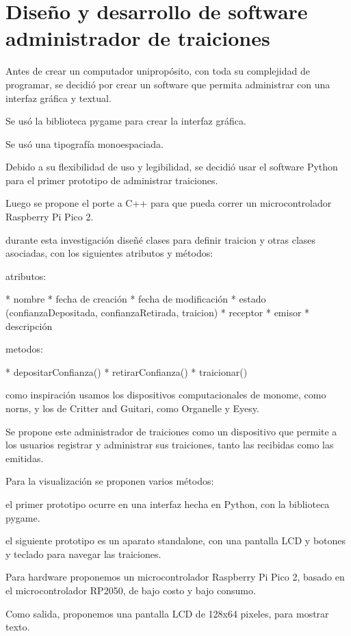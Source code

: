 \documentclass{article}
\begin{document}
\section{Diseño y desarrollo de software administrador de traiciones}

Antes de crear un computador unipropósito, con toda su complejidad de programar, se decidió por crear un software que permita administrar con una interfaz gráfica y textual.

Se usó la biblioteca pygame para crear la interfaz gráfica.

Se usó una tipografía monoespaciada.

Debido a su flexibilidad de uso y legibilidad, se decidió usar el software Python para el primer prototipo de administrar traiciones.

Luego se propone el porte a C++ para que pueda correr un microcontrolador Raspberry Pi Pico 2.

durante esta investigación diseñé clases para definir traicion y otras clases asociadas, con los siguientes atributos y métodos:

atributos:

* nombre
* fecha de creación
* fecha de modificación
* estado (confianzaDepositada, confianzaRetirada, traicion)
* receptor
* emisor
* descripción

metodos:

* depositarConfianza()
* retirarConfianza()
* traicionar()

como inspiración usamos los dispositivos computacionales de monome, como norns, y los de Critter and Guitari, como Organelle y Eyesy.

Se propone este administrador de traiciones como un dispositivo que permite a los usuarios registrar y administrar sus traiciones, tanto las recibidas como las emitidas.

Para la visualización se proponen varios métodos:

el primer prototipo ocurre en una interfaz hecha en Python, con la biblioteca pygame.

el siguiente prototipo es un aparato standalone, con una pantalla LCD y botones y teclado para navegar las traiciones.

Para hardware proponemos un microcontrolador Raspberry Pi Pico 2, basado en el microcontrolador RP2050, de bajo costo y bajo consumo.

Como salida, proponemos una pantalla LCD de 128x64 pixeles, para mostrar texto.

\clearpage
\end{document}
